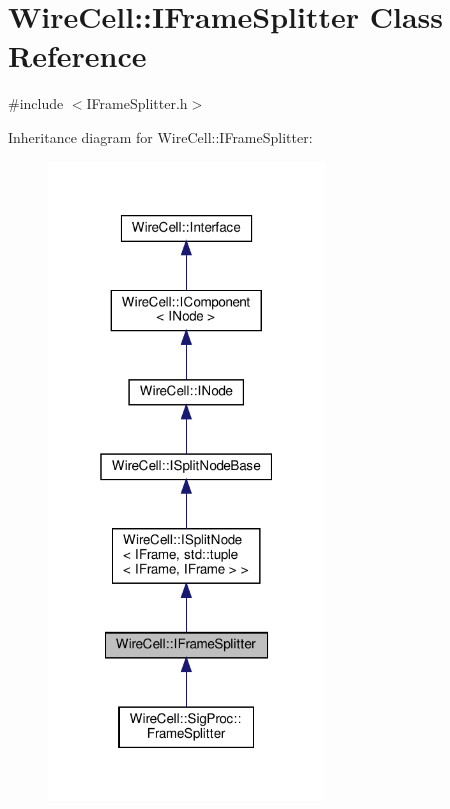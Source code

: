 \hypertarget{class_wire_cell_1_1_i_frame_splitter}{}\section{Wire\+Cell\+:\+:I\+Frame\+Splitter Class Reference}
\label{class_wire_cell_1_1_i_frame_splitter}


{\ttfamily \#include $<$I\+Frame\+Splitter.\+h$>$}



Inheritance diagram for Wire\+Cell\+:\+:I\+Frame\+Splitter\+:
\nopagebreak
\begin{figure}[H]
\begin{center}
\leavevmode
\includegraphics[width=208pt]{class_wire_cell_1_1_i_frame_splitter__inherit__graph}
\end{center}
\end{figure}


